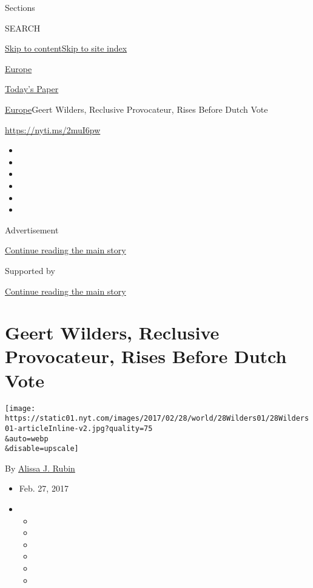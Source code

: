 Sections

SEARCH

\protect\hyperlink{site-content}{Skip to
content}\protect\hyperlink{site-index}{Skip to site index}

\href{https://www.nytimes.com/section/world/europe}{Europe}

\href{https://myaccount.nytimes.com/auth/login?response_type=cookie\&client_id=vi}{}

\href{https://www.nytimes.com/section/todayspaper}{Today's Paper}

\href{/section/world/europe}{Europe}\textbar{}Geert Wilders, Reclusive
Provocateur, Rises Before Dutch Vote

\url{https://nyti.ms/2muI6pw}

\begin{itemize}
\item
\item
\item
\item
\item
\item
\end{itemize}

Advertisement

\protect\hyperlink{after-top}{Continue reading the main story}

Supported by

\protect\hyperlink{after-sponsor}{Continue reading the main story}

\hypertarget{geert-wilders-reclusive-provocateur-rises-before-dutch-vote}{%
\section{Geert Wilders, Reclusive Provocateur, Rises Before Dutch
Vote}\label{geert-wilders-reclusive-provocateur-rises-before-dutch-vote}}

\texttt{[image: https://static01.nyt.com/images/2017/02/28/world/28Wilders01/28Wilders01-articleInline-v2.jpg?quality=75\\\&auto=webp\\\&disable=upscale]}

By \href{https://www.nytimes.com/by/alissa-j-rubin}{Alissa J. Rubin}

\begin{itemize}
\item
  Feb. 27, 2017
\item
  \begin{itemize}
  \item
  \item
  \item
  \item
  \item
  \item
  \end{itemize}
\end{itemize}

